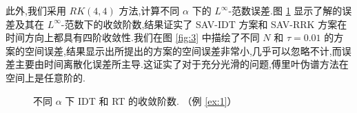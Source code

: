    此外,我们采用 $RK(4,4)$ 方法,计算不同 $\alpha$ 下的 $L^{\infty}$-范数误差.图 \ref{fig:2} 显示了解的误差及其在 $L^{\infty}$-范数下的收敛阶数,结果证实了 SAV-IDT 方案和 SAV-RRK 方案在时间方向上都具有四阶收敛性.我们在图 \ref{fig:3} 中描绘了不同 $N$ 和 $\tau=0.01$ 的方案的空间误差,结果显示出所提出的方案的空间误差非常小,几乎可以忽略不计,而误差主要由时间离散化误差所主导.这证实了对于充分光滑的问题,傅里叶伪谱方法在空间上是任意阶的.
    \begin{figure}[H]
		\begin{center}
		\caption{不同 $\alpha$ 下 IDT 和 RT 的收敛阶数. （例 \ref{ex:1}）} 
		\label{fig:2}
		\end{center}
		\end{figure}

